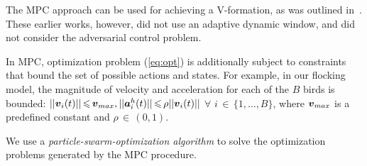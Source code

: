 The MPC approach can be used for achieving a V-formation, as was outlined in~\cite{yang2016bda,yang2016love}.  These earlier works, however, did not use an adaptive dynamic window, and did not consider the adversarial control problem.
%
%
%

In MPC, optimization problem (\ref{eq:opt}) is additionally subject to constraints that bound the set of possible actions and states. For example, in our flocking model, the
magnitude of velocity and acceleration for each of the $B$ birds is bounded: $||{\boldsymbol {v}}_i(t)||\,{\leqslant}\,{\boldsymbol {v}}_{max},
||{\boldsymbol {a}}^h_i(t)||\,{\leqslant}\,\rho||{\boldsymbol {v}}_i(t)||$ $\forall$ $i\,{\in}\,\{1,\ldots,B\}$,
where ${\boldsymbol {v}}_{max}$ is a predefined constant and $\rho\,{\in}\,(0,1)$. 

We use a \emph{particle-swarm-optimization algorithm} to solve the optimization problems generated by the MPC procedure.

